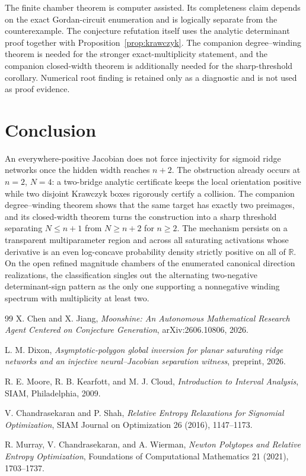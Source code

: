 \documentclass[11pt]{article}
\theoremstyle{remark}
\newcommand{\R}{\mathbb R}
\begin{document}
The finite chamber theorem is computer assisted. Its completeness claim depends on the exact Gordan-circuit enumeration and is logically separate from the counterexample. The conjecture refutation itself uses the analytic determinant proof together with Proposition~\ref{prop:krawczyk}. The companion degree--winding theorem is needed for the stronger exact-multiplicity statement, and the companion closed-width theorem is additionally needed for the sharp-threshold corollary. Numerical root finding is retained only as a diagnostic and is not used as proof evidence.

\section{Conclusion}
An everywhere-positive Jacobian does not force injectivity for sigmoid ridge networks once the hidden width reaches $n+2$. The obstruction already occurs at $n=2$, $N=4$: a two-bridge analytic certificate keeps the local orientation positive while two disjoint Krawczyk boxes rigorously certify a collision. The companion degree--winding theorem shows that the same target has exactly two preimages, and its closed-width theorem turns the construction into a sharp threshold separating $N\le n+1$ from $N\ge n+2$ for $n\ge2$. The mechanism persists on a transparent multiparameter region and across all saturating activations whose derivative is an even log-concave probability density strictly positive on all of $\R$. On the open refined magnitude chambers of the enumerated canonical direction realizations, the classification singles out the alternating two-negative determinant-sign pattern as the only one supporting a nonnegative winding spectrum with multiplicity at least two.

\begin{thebibliography}{99}
X. Chen and X. Jiang,
\emph{Moonshine: An Autonomous Mathematical Research Agent Centered on Conjecture Generation},
arXiv:2606.10806, 2026.

L. M. Dixon,
\emph{Asymptotic-polygon global inversion for planar saturating ridge networks and an injective neural--Jacobian separation witness},
preprint, 2026.

R. E. Moore, R. B. Kearfott, and M. J. Cloud,
\emph{Introduction to Interval Analysis},
SIAM, Philadelphia, 2009.

V. Chandrasekaran and P. Shah,
\emph{Relative Entropy Relaxations for Signomial Optimization},
SIAM Journal on Optimization 26 (2016), 1147--1173.

R. Murray, V. Chandrasekaran, and A. Wierman,
\emph{Newton Polytopes and Relative Entropy Optimization},
Foundations of Computational Mathematics 21 (2021), 1703--1737.

\end{thebibliography}
\end{document}
